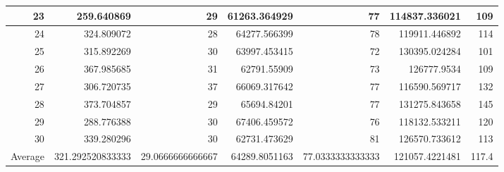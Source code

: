 \begin{table}
\begin{adjustwidth}{}{}
{{\begin{tabular}{|r|r|r|r|r|r|r|}
	\hline
	23                                         & 259.640869                   & 29                                    & 61263.364929                   & 77                                    & 114837.336021                & 109                                    \\ 
	\hline
	24                                         & 324.809072                   & 28                                    & 64277.566399                   & 78                                    & 119911.446892                & 114                                    \\ 
	\hline
	25                                         & 315.892269                   & 30                                    & 63997.453415                   & 72                                    & 130395.024284                & 101                                    \\ 
	\hline
	26                                         & 367.985685                   & 31                                    & 62791.55909                    & 73                                    & 126777.9534                  & 109                                    \\ 
	\hline
	27                                         & 306.720735                   & 37                                    & 66069.317642                   & 77                                    & 116590.569717                & 132                                    \\ 
	\hline
	28                                         & 373.704857                   & 29                                    & 65694.84201                    & 77                                    & 131275.843658                & 145                                    \\ 
	\hline
	29                                         & 288.776388                   & 30                                    & 67406.459572                   & 76                                    & 118132.533211                & 120                                    \\ 
	\hline
	30                                         & 339.280296                   & 30                                    & 62731.473629                   & 81                                    & 126570.733612                & 113                                    \\ 
	\hline
	\multicolumn{1}{|l|}{Average}              & 321.292520833333             & 29.0666666666667                      & 64289.8051163                  & 77.0333333333333                      & 121057.4221481               & 117.4                                  \\ 

\end{tabular}}}
\end{adjustwidth}
\end{table}
